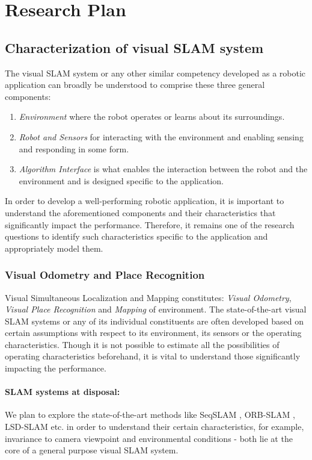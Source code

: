\documentclass{article}
\begin{document}
\section{Research Plan}

\subsection{Characterization of visual SLAM system}
The visual SLAM system or any other similar competency developed as a robotic application can broadly be understood to comprise these three general components:
\begin{enumerate}
 \item \emph{Environment} where the robot operates or learns about its surroundings.
 \item \emph{Robot and Sensors} for interacting with the environment and enabling sensing and responding in some form.
 \item \emph{Algorithm Interface} is what enables the interaction between the robot and the environment and is designed specific to the application.
\end{enumerate}

In order to develop a well-performing robotic application, it is important to understand the aforementioned components and their characteristics that significantly impact the performance. Therefore, it remains one of the research questions to identify such characteristics specific to the application and appropriately model them.

\subsubsection{Visual Odometry and Place Recognition}
Visual Simultaneous Localization and Mapping constitutes: \emph{Visual Odometry}, \emph{Visual Place Recognition} and \emph{Mapping} of environment. The state-of-the-art visual SLAM systems or any of its individual constituents are often developed based on certain assumptions with respect to its environment, its sensors or the operating characteristics. Though it is not possible to estimate all the possibilities of operating characteristics beforehand, it is vital to understand those significantly impacting the performance.

\paragraph{SLAM systems at disposal:}We plan to explore the state-of-the-art methods like SeqSLAM \cite{Milford2012}, ORB-SLAM \cite{Mur-Artal2015}, LSD-SLAM \cite{Engel2014lsd} etc. in order to understand their certain characteristics, for example, invariance to camera viewpoint and environmental conditions - both lie at the core of a general purpose visual SLAM system.
\end{document}
